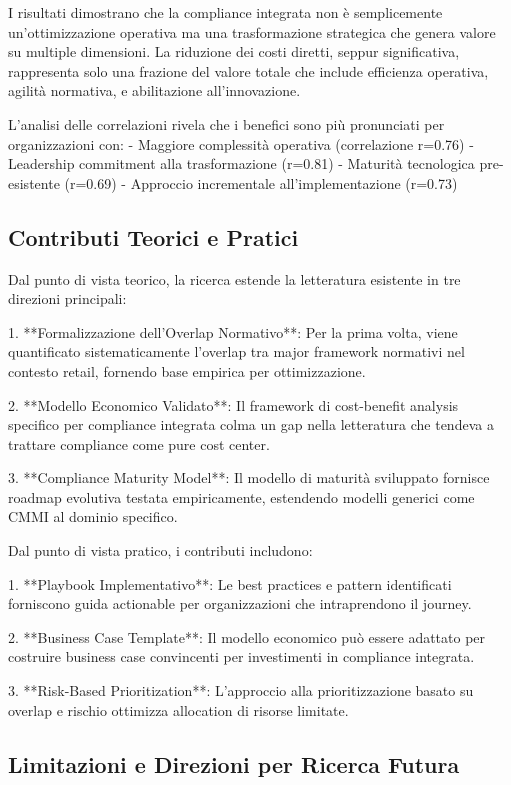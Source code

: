 I risultati dimostrano che la compliance integrata non è semplicemente un'ottimizzazione operativa ma una trasformazione strategica che genera valore su multiple dimensioni. La riduzione dei costi diretti, seppur significativa, rappresenta solo una frazione del valore totale che include efficienza operativa, agilità normativa, e abilitazione all'innovazione.

L'analisi delle correlazioni rivela che i benefici sono più pronunciati per organizzazioni con:
- Maggiore complessità operativa (correlazione r=0.76)
- Leadership commitment alla trasformazione (r=0.81)
- Maturità tecnologica pre-esistente (r=0.69)
- Approccio incrementale all'implementazione (r=0.73)

\subsection{Contributi Teorici e Pratici}

Dal punto di vista teorico, la ricerca estende la letteratura esistente in tre direzioni principali:

1. **Formalizzazione dell'Overlap Normativo**: Per la prima volta, viene quantificato sistematicamente l'overlap tra major framework normativi nel contesto retail, fornendo base empirica per ottimizzazione.

2. **Modello Economico Validato**: Il framework di cost-benefit analysis specifico per compliance integrata colma un gap nella letteratura che tendeva a trattare compliance come pure cost center.

3. **Compliance Maturity Model**: Il modello di maturità sviluppato fornisce roadmap evolutiva testata empiricamente, estendendo modelli generici come CMMI al dominio specifico.

Dal punto di vista pratico, i contributi includono:

1. **Playbook Implementativo**: Le best practices e pattern identificati forniscono guida actionable per organizzazioni che intraprendono il journey.

2. **Business Case Template**: Il modello economico può essere adattato per costruire business case convincenti per investimenti in compliance integrata.

3. **Risk-Based Prioritization**: L'approccio alla prioritizzazione basato su overlap e rischio ottimizza allocation di risorse limitate.

\subsection{Limitazioni e Direzioni per Ricerca Futura}

